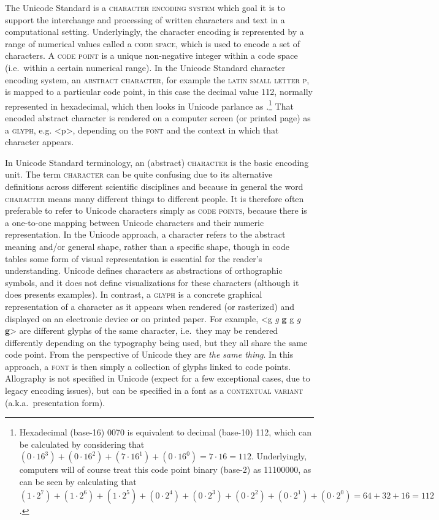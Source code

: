 The Unicode Standard is a \textsc{character encoding system} which
goal it is to support the interchange and processing of written characters and
text in a computational setting. Underlyingly, the character encoding is
represented by a range of numerical values called a \textsc{code space}, which
is used to encode a set of characters. A \textsc{code point} is a unique
non-negative integer within a code space (i.e.~within a certain numerical
range). In the Unicode Standard character encoding system, an \textsc{abstract
character}, for example the \textsc{latin small letter p}, is mapped to a
particular code point, in this case the decimal value 112, normally represented in
hexadecimal, which then looks in Unicode parlance as
.\footnote{Hexadecimal (base-16) 0070 is equivalent to decimal
(base-10) 112, which can be calculated by considering that $(0\cdot16^3) +
(0\cdot16^2) + (7\cdot16^1) + (0\cdot16^0) = 7\cdot16 = 112$. Underlyingly,
computers will of course treat this code point binary (base-2) as 11100000, as
can be seen by calculating that $(1\cdot2^7) + (1\cdot2^6) + (1\cdot2^5) +
(0\cdot2^4) + (0\cdot2^3) + (0\cdot2^2) + (0\cdot2^1) + (0\cdot2^0) = 64 + 32 +
16 = 112$.} That encoded abstract character is rendered on a computer screen (or
printed page) as a \textsc{glyph}, e.g. <p>, depending on the \textsc{font} and
the context in which that character appears.

In Unicode Standard terminology, an (abstract) \textsc{character} is the basic
encoding unit. The term \textsc{character} can be quite confusing due to its
alternative definitions across different scientific disciplines and because in
general the word \textsc{character} means many different things to different
people. It is therefore often preferable to refer to Unicode characters simply
as \textsc{code points}, because there is a one-to-one mapping between Unicode
characters and their numeric representation. In the Unicode approach, a
character refers to the abstract meaning and/or general shape, rather than a
specific shape, though in code tables some form of visual representation is
essential for the reader's understanding. Unicode defines characters as
abstractions of orthographic symbols, and it does not define visualizations for
these characters (although it does presents examples). In contrast, a
\textsc{glyph} is a concrete graphical representation of a character as it
appears when rendered (or rasterized) and displayed on an electronic device or
on printed paper. For example, <g {\large \textit{g}} \textbf{g}
{ {\small g} \textit{g} \textbf{g}}> are different glyphs of the
same character, i.e.~they may be rendered differently depending on the
typography being used, but they all share the same code point. From the
perspective of Unicode they are \textit{the same thing}. In this approach, a
\textsc{font} is then simply a collection of glyphs linked to code points.
Allography is not specified in Unicode (expect for a few exceptional cases, due
to legacy encoding issues), but can be specified in a font as a
\textsc{contextual variant} (a.k.a.~presentation form).

